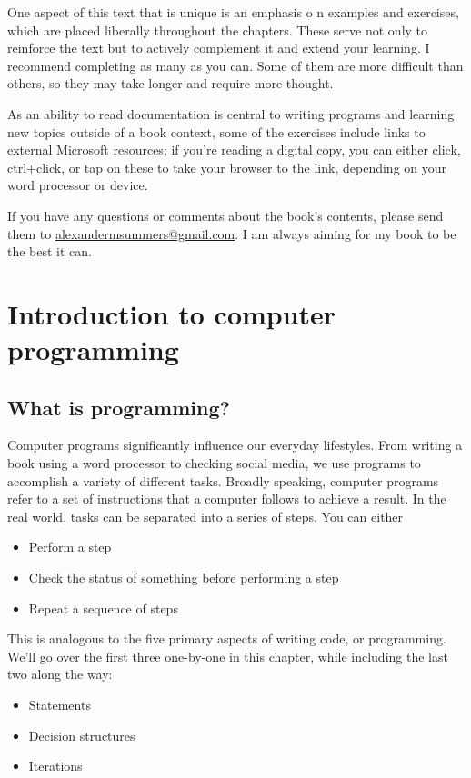 \documentclass[oneside, openany] {book}
\begin{document}
One aspect of this text that is unique is an emphasis o n examples and exercises, which are placed liberally throughout the chapters. These serve not only to reinforce the text but to actively complement it and extend your learning. I recommend completing as many as you can. Some of them are more difficult than others, so they may take longer and require more thought.

As an ability to read documentation is central to writing programs and learning new topics outside of a book context, some of the exercises include links to external Microsoft resources; if you're reading a digital copy, you can either click, ctrl+click, or tap on these to take your browser to the link, depending on your word processor or device.

If you have any questions or comments about the book's contents, please send them to \href{mailto:alexandermsummers@gmail.com}{alexandermsummers@gmail.com}. I am always aiming for my book to be the best it can.
\mainmatter
\chapter{Introduction to computer programming}
\minitoc
\section{What is programming?}
Computer programs significantly influence our everyday lifestyles. From writing a book using a word processor to checking social media, we use programs to accomplish a variety of different tasks. Broadly speaking, computer programs refer to a set of instructions that a computer follows to achieve a result.
In the real world, tasks can be separated into a series of steps. You can either
\begin{itemize}
\item Perform a step
\item Check the status of something before performing a step
\item Repeat a sequence of steps
\end{itemize}

This is analogous to the five primary aspects of writing code, or programming. We'll go over the first three one-by-one in this chapter, while including the last two along the way:
\begin{itemize}
\item Statements
\item Decision structures
\item Iterations
\end{itemize}
\end{document}
